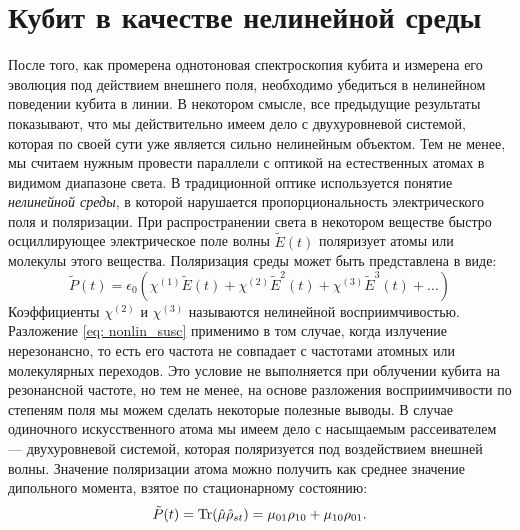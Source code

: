 \section{Кубит в качестве нелинейной среды}
После того, как промерена однотоновая спектроскопия кубита и измерена его эволюция под действием внешнего поля, необходимо убедиться в нелинейном поведении кубита в линии. В некотором смысле, все предыдущие результаты показывают, что мы действительно имеем дело с двухуровневой системой, которая по своей сути уже является сильно нелинейным объектом. Тем не менее, мы считаем нужным провести параллели с оптикой на естественных атомах в видимом диапазоне света. В традиционной оптике используется понятие \textit{нелинейной среды}, в которой нарушается пропорциональность электрического поля и поляризации. При распространении света в некотором веществе быстро осциллирующее электрическое поле волны $\tilde{E}(t)$ поляризует атомы или молекулы этого вещества. Поляризация среды может быть представлена в виде:
\begin{equation}
\tilde{P}(t) = \epsilon_0\left(\chi^{(1)}\tilde{E}(t) + \chi^{(2)}\tilde{E}^2(t) + \chi^{(3)}\tilde{E}^3(t) + \ldots\right)
\label{eq: nonlin_susc}
\end{equation}
Коэффициенты $\chi^{(2)}$ и $\chi^{(3)}$ называются нелинейной восприимчивостью. Разложение \eqref{eq: nonlin_susc} применимо в том случае, когда излучение нерезонансно, то есть его частота не совпадает с частотами атомных или молекулярных переходов. Это условие не выполняется при облучении кубита на резонансной частоте, но тем не менее, на основе разложения восприимчивости по степеням поля мы можем сделать некоторые полезные выводы. В случае одиночного искусственного атома мы имеем дело с насыщаемым рассеивателем --- двухуровневой системой, которая поляризуется под воздействием внешней волны. Значение поляризации атома можно получить как среднее значение дипольного момента, взятое по стационарному состоянию:
\begin{equation}
\tilde{P}(t) = \operatorname{Tr}(\hat{\mu}\hat{\rho}_{st}) = \mu_{01}\rho_{10} + \mu_{10}\rho_{01}.
\end{equation}

